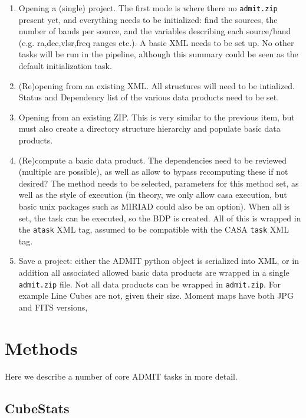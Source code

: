 \documentclass{article}
\begin{document}
\begin{enumerate}

\item
Opening a (single) project. The first mode is where there no {\tt admit.zip} 
present yet, and everything needs to be initialized: find
the sources, the number of bands per source, and the variables
describing each source/band (e.g. ra,dec,vlsr,freq ranges etc.). A
basic XML needs to be set up.  No other tasks will be run in the
pipeline, although this summary could be seen as the default
initialization task.


\item
(Re)opening from an existing XML.  All structures will need to be 
intialized. Status and Dependency list of the various data products
need to be set.

\item
Opening from an existing ZIP. This is very similar to the previous
item, but must also create a directory structure hierarchy and 
populate basic data products.

\item
(Re)compute a basic data product. The dependencies need to be reviewed
(multiple are possible), as well as allow to bypass recomputing these
if not desired?  The method needs to be selected, parameters for this
method set, as well as the style of execution (in theory, we only
allow casa execution, but basic unix packages such as MIRIAD could 
also be an option).  When all is set, the task can be executed, so the
BDP is created. All of this is wrapped in the {\tt atask} XML tag,
assumed to be compatible with the CASA {\tt task} XML tag.

\item
Save a project:  either the ADMIT python object is serialized into XML, 
or in addition all associated allowed basic data products 
are wrapped in a single {\tt admit.zip} file. Not all data products
can be wrapped in {\tt admit.zip}. For example Line Cubes are not, given
their size. Moment maps have both JPG and FITS versions, 


\end{enumerate}

\section{Methods}

Here we describe a number of core ADMIT tasks in more detail.

\subsection{CubeStats}
\end{document}
